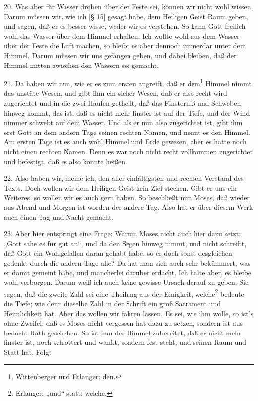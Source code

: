 20. Was aber für Wasser droben über der Feste sei, können wir nicht wohl wissen. Darum müssen wir, wie ich [§ 15] gesagt habe, dem Heiligen Geist Raum geben, und sagen, daß er es besser wisse, weder wir es verstehen. So kann Gott freilich wohl das Wasser über dem Himmel erhalten. Ich wollte wohl aus dem Wasser über der Feste die Luft machen, so bleibt es aber dennoch immerdar unter dem Himmel. Darum müssen wir uns gefangen geben, und dabei bleiben, daß der Himmel mitten zwischen den Wassern sei gemacht.

21. Da haben wir nun, wie er es zum ersten angreift, daß er dem\footnote{Wittenberger und Erlanger: den.} Himmel nimmt das unstäte Wesen, und gibt ihm ein sicher Wesen, daß er also recht wird zugerichtet und in die zwei Haufen getheilt, daß das Finsterniß und Schweben hinweg kommt, das ist, daß es nicht mehr finster ist auf der Tiefe, und der Wind nimmer schwebt auf dem Wasser. Und als er nun also zugerichtet ist, gibt ihm erst Gott an dem andern Tage seinen rechten Namen, und nennt es den Himmel. Am ersten Tage ist es auch wohl Himmel und Erde gewesen, aber es hatte noch nicht einen rechten Namen. Denn es war noch nicht recht vollkommen zugerichtet und befestigt, daß es also konnte heißen.

22. Also haben wir, meine ich, den aller einfältigsten und rechten Verstand des Texts. Doch wollen wir dem Heiligen Geist kein Ziel stecken. Gibt er uns ein Weiteres, so wollen wir es auch gern haben. So beschließt nun Moses, daß wieder aus Abend und Morgen ist worden der andere Tag. Also hat er über diesem Werk auch einen Tag und Nacht gemacht.

23. Aber hier entspringt eine Frage: Warum Moses nicht auch hier dazu setzt: „Gott sahe es für gut an“, und da den Segen hinweg nimmt, und nicht schreibt, daß Gott ein Wohlgefallen daran gehabt habe, so er doch sonst desgleichen gedenkt durch die andern Tage alle? Da hat man sich auch sehr bekümmert, was er damit gemeint habe, und mancherlei darüber erdacht. Ich halte aber, es bleibe wohl verborgen. Darum weiß ich auch keine gewisse Ursach darauf zu geben. Sie sagen, daß die zweite Zahl sei eine Theilung aus der Einigkeit, welche\footnote{Erlanger: „und“ statt: welche.} bedeute die Tiefe; wie denn dieselbe Zahl in der Schrift ein groß Sacrament und Heimlichkeit hat. Aber das wollen wir fahren lassen. Es sei, wie ihm wolle, so ist’s ohne Zweifel, daß es Moses nicht vergessen hat dazu zu setzen, sondern ist aus bedacht Rath geschehen. So ist nun der Himmel zubereitet, daß er nicht mehr finster ist, noch schlottert und wankt, sondern fest steht, und seinen Raum und Statt hat. Folgt

